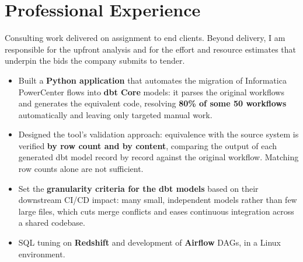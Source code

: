 \documentclass[10pt]{article}
\begin{document}
\section{Professional Experience}

\vspace{0.1cm}
Consulting work delivered on assignment to end clients. Beyond delivery, I am responsible for the upfront analysis and for the effort and resource estimates that underpin the bids the company submits to tender.

\begin{itemize}
    \item Built a \textbf{Python application} that automates the migration of Informatica PowerCenter flows into \textbf{dbt Core} models: it parses the original workflows and generates the equivalent code, resolving \textbf{80\% of some 50 workflows} automatically and leaving only targeted manual work.
    \item Designed the tool's validation approach: equivalence with the source system is verified \textbf{by row count and by content}, comparing the output of each generated dbt model record by record against the original workflow. Matching row counts alone are not sufficient.
    \item Set the \textbf{granularity criteria for the dbt models} based on their downstream CI/CD impact: many small, independent models rather than few large files, which cuts merge conflicts and eases continuous integration across a shared codebase.
    \item SQL tuning on \textbf{Redshift} and development of \textbf{Airflow} DAGs, in a Linux environment.
\end{itemize}
\end{document}
